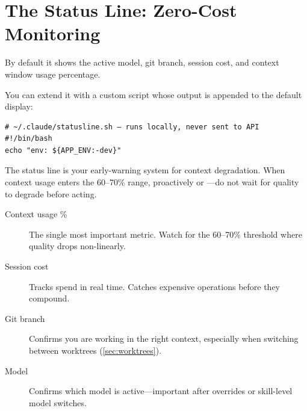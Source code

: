 

\section{The Status Line: Zero-Cost Monitoring}
\label{sec:statusline}


 By default it shows the active model, git branch,
session cost, and context window usage percentage.

You can extend it with a custom script whose output is appended
to the default display:

\begin{verbatim}
# ~/.claude/statusline.sh — runs locally, never sent to API
#!/bin/bash
echo "env: ${APP_ENV:-dev}"
\end{verbatim}

The status line is your early-warning system for context degradation.
When context usage enters the 60--70\% range, proactively  or
---do not wait for quality to degrade before acting.

\begin{tipbox}
\begin{description}
  \item[Context usage \%] The single most important metric.
    Watch for the 60--70\% threshold where quality drops non-linearly.
  \item[Session cost] Tracks spend in real time. Catches expensive
    operations before they compound.
  \item[Git branch] Confirms you are working in the right context,
    especially when switching between worktrees (\cref{sec:worktrees}).
  \item[Model] Confirms which model is active---important after
     overrides or skill-level model switches.
\end{description}
\end{tipbox}

